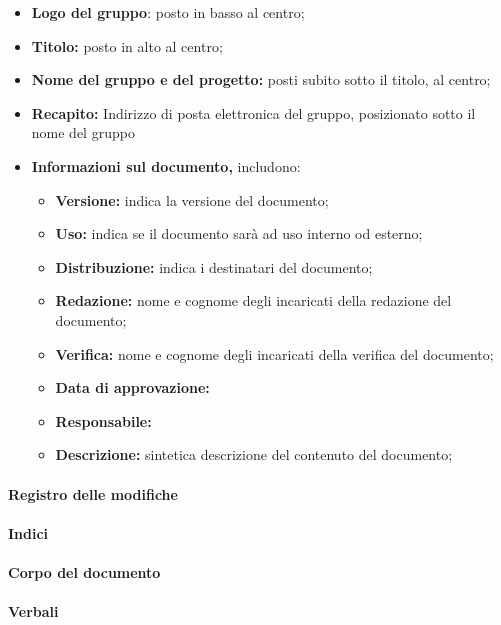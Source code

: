 \begin{itemize}

	\item \textbf{Logo del gruppo}: posto in basso al centro;
	\item \textbf{Titolo:} posto in alto al centro;
	\item \textbf{Nome del gruppo e del progetto:} posti subito sotto il titolo, al centro;
	\item \textbf{Recapito:} Indirizzo di posta elettronica del gruppo, posizionato sotto il nome del gruppo
	\item \textbf{Informazioni sul documento,} includono:
	
	\begin{itemize}
		\item \textbf{Versione:} indica la versione del documento;
		\item \textbf{Uso:} indica se il documento sarà ad uso interno od esterno;
		\item \textbf{Distribuzione:} indica i destinatari del documento;
		\item \textbf{Redazione:} nome e cognome degli incaricati della redazione del documento;
		\item \textbf{Verifica:} nome e cognome degli incaricati della verifica del documento;
		\item \textbf{Data di approvazione:}
		\item \textbf{Responsabile:}
		\item \textbf{Descrizione:} sintetica descrizione del contenuto del documento;
	\end{itemize}

\end{itemize}

\paragraph{Registro delle modifiche}

\paragraph{Indici}

\paragraph{Corpo del documento}

\paragraph{Verbali}

